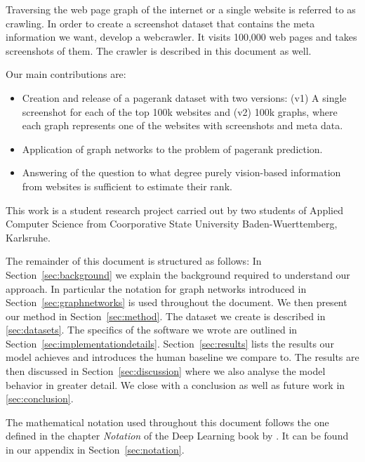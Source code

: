 Traversing the web page graph of the internet or a single website is referred to as crawling. In order to create a screenshot dataset that contains the meta information we want, develop a webcrawler. It visits 100,000 web pages and takes screenshots of them. The crawler is described in this document as well.

Our main contributions are:
\begin{itemize}
\item Creation and release of a pagerank dataset with two versions: (v1) A single screenshot for each of the top 100k websites and (v2) 100k graphs, where each graph represents one of the websites with screenshots and meta data.
\item Application of graph networks to the problem of pagerank prediction.
\item Answering of the question to what degree purely vision-based information from websites is sufficient to estimate their rank.
\end{itemize}

This work is a student research project carried out by two students of Applied Computer Science from Coorporative State University Baden-Wuerttemberg, Karlsruhe.

The remainder of this document is structured as follows: In Section~\ref{sec:background} we explain the background required to understand our approach. In particular the notation for graph networks introduced in Section~\ref{sec:graphnetworks} is used throughout the document. We then present our method in Section~\ref{sec:method}. The dataset we create is described in \ref{sec:datasets}. The specifics of the software we wrote are outlined in Section~\ref{sec:implementationdetails}. Section~\ref{sec:results} lists the results our model achieves and introduces the human baseline we compare to. The results are then discussed in Section~\ref{sec:discussion} where we also analyse the model behavior in greater detail. We close with a conclusion as well as future work in \ref{sec:conclusion}.

The mathematical notation used throughout this document follows the one defined in the chapter \textit{Notation} of the Deep Learning book by \cite{goodfellow:dlbook}. It can be found in our appendix in Section~\ref{sec:notation}.
